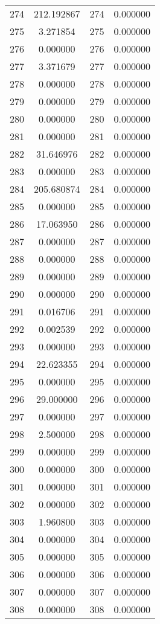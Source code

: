 \documentclass[12pt]{article}
\begin{document}
\begin{longtable}{@{}cccc@{}}
274 & 212.192867 & 274 & 0.000000 \\
275 & 3.271854 & 275 & 0.000000 \\
276 & 0.000000 & 276 & 0.000000 \\
277 & 3.371679 & 277 & 0.000000 \\
278 & 0.000000 & 278 & 0.000000 \\
279 & 0.000000 & 279 & 0.000000 \\
280 & 0.000000 & 280 & 0.000000 \\
281 & 0.000000 & 281 & 0.000000 \\
282 & 31.646976 & 282 & 0.000000 \\
283 & 0.000000 & 283 & 0.000000 \\
284 & 205.680874 & 284 & 0.000000 \\
285 & 0.000000 & 285 & 0.000000 \\
286 & 17.063950 & 286 & 0.000000 \\
287 & 0.000000 & 287 & 0.000000 \\
288 & 0.000000 & 288 & 0.000000 \\
289 & 0.000000 & 289 & 0.000000 \\
290 & 0.000000 & 290 & 0.000000 \\
291 & 0.016706 & 291 & 0.000000 \\
292 & 0.002539 & 292 & 0.000000 \\
293 & 0.000000 & 293 & 0.000000 \\
294 & 22.623355 & 294 & 0.000000 \\
295 & 0.000000 & 295 & 0.000000 \\
296 & 29.000000 & 296 & 0.000000 \\
297 & 0.000000 & 297 & 0.000000 \\
298 & 2.500000 & 298 & 0.000000 \\
299 & 0.000000 & 299 & 0.000000 \\
300 & 0.000000 & 300 & 0.000000 \\
301 & 0.000000 & 301 & 0.000000 \\
302 & 0.000000 & 302 & 0.000000 \\
303 & 1.960800 & 303 & 0.000000 \\
304 & 0.000000 & 304 & 0.000000 \\
305 & 0.000000 & 305 & 0.000000 \\
306 & 0.000000 & 306 & 0.000000 \\
307 & 0.000000 & 307 & 0.000000 \\
308 & 0.000000 & 308 & 0.000000 \\

\end{longtable}
\end{document}
